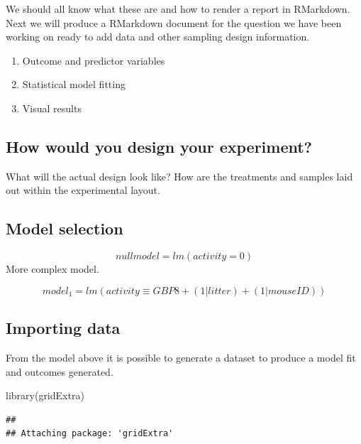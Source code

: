 \documentclass[
]{book}
\newenvironment{Shaded}{\begin{snugshade}}{\end{snugshade}}
\newcommand{\FunctionTok}[1]{\textcolor[rgb]{0.00,0.00,0.00}{#1}}
\newcommand{\NormalTok}[1]{#1}
\providecommand{\tightlist}{%
  \setlength{\itemsep}{0pt}\setlength{\parskip}{0pt}}
\begin{document}
We should all know what these are and how to render a report in RMarkdown. Next we will produce a RMarkdown document for the question we have been working on ready to add data and other sampling design information.

\begin{enumerate}
\def\labelenumi{\arabic{enumi}.}
\tightlist
\item
  Outcome and predictor variables
\item
  Statistical model fitting
\item
  Visual results
\end{enumerate}

\hypertarget{how-would-you-design-your-experiment}{%
\subsection{How would you design your experiment?}\label{how-would-you-design-your-experiment}}

What will the actual design look like? How are the treatments and samples laid out within the experimental layout.

\hypertarget{model-selection}{%
\subsection{Model selection}\label{model-selection}}

\[ null model = lm(activity = 0) \]
More complex model.

\[ model_1 = lm(activity \equiv GBP8 + (1|litter) + (1|mouseID)) \]

\hypertarget{importing-data}{%
\subsection{Importing data}\label{importing-data}}

From the model above it is possible to generate a dataset to produce a model fit and outcomes generated.

\begin{Shaded}
\begin{Highlighting}[]
\FunctionTok{library}\NormalTok{(gridExtra)}
\end{Highlighting}
\end{Shaded}

\begin{verbatim}
## 
## Attaching package: 'gridExtra'
\end{verbatim}
\end{document}
